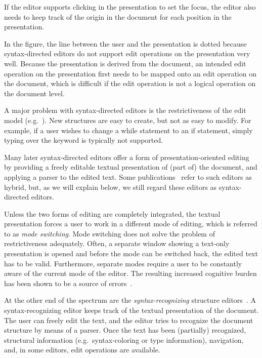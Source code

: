 If the editor supports clicking in the presentation to set the focus, the editor also needs to keep track of the origin in the document for each position in the presentation.

In the figure, the line between the user and the presentation is dotted because syntax-directed editors do not support edit operations on the presentation very well. Because the presentation is derived from the document, an intended edit operation on the presentation first needs to be mapped onto an edit operation on the document, which is difficult if the edit operation is not a logical operation on the document level.

A major problem with syntax-directed editors is the restrictiveness of the edit model (e.g.~\cite{vanter94practical,rubinNeal87design}). New structures are easy to create, but not as easy to modify. For example, if a user wishes to change a while statement to an if statement, simply typing over the keyword is typically not supported. 

Many later syntax-directed editors offer a form of presentation-oriented editing by providing a freely editable textual presentation of (part of) the document, and applying a parser to the edited text. Some publications~\cite{teitelbaum81progSynth, minor90editing} refer to such editors as hybrid, but, as we will explain below, we still regard these editors as syntax-directed editors. 

Unless the two forms of editing are completely integrated, the textual presentation forces a user to work in a different mode of editing, which is referred to as {\em mode switching}. Mode switching does not solve the problem of restrictiveness adequately. Often, a separate window showing a text-only presentation is opened and before the mode can be switched back, the edited text has to be valid. Furthermore, separate modes require a user to be constantly aware of the current mode of the editor. The resulting increased cognitive burden has been shown to be a source of errors~\cite{sellen90modes}.


At the other end of the spectrum are the {\em syntax-recognizing} structure editors~\cite{budinsky85sre, ballance92pan}. A syntax-recognizing editor keeps track of the textual presentation of the document. The user can freely edit the text, and the editor tries to recognize the document structure by means of a parser. Once the text has been (partially) recognized, structural information (e.g.\ syntax-coloring or type information), navigation, and, in some editors, edit operations are available.

